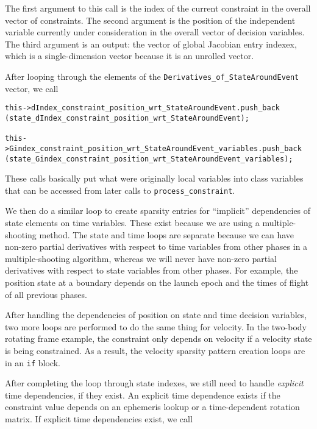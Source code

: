 \documentclass[11pt]{article}
\begin{document}
\noindent The first argument to this call is the index of the current constraint in the overall vector of constraints. The second argument is the position of the independent variable currently under consideration in the overall vector of decision variables. The third argument is an output: the vector of global Jacobian entry indexex, which is a single-dimension vector because it is an unrolled vector.

After looping through the elements of the \texttt{Derivatives\_of\_StateAroundEvent} vector, we call

\begin{verbatim}
this->dIndex_constraint_position_wrt_StateAroundEvent.push_back
(state_dIndex_constraint_position_wrt_StateAroundEvent);

this->Gindex_constraint_position_wrt_StateAroundEvent_variables.push_back
(state_Gindex_constraint_position_wrt_StateAroundEvent_variables);
\end{verbatim}

\noindent These calls basically put what were originally local variables into class variables that can be accessed from later calls to \texttt{process\_constraint}.

We then do a similar loop to create sparsity entries for ``implicit'' dependencies of state elements on time variables. These exist because we are using a multiple-shooting method. The state and time loops are separate because we can have non-zero partial derivatives with respect to time variables from other phases in a multiple-shooting algorithm, whereas we will never have non-zero partial derivatives with respect to state variables from other phases. For example, the position state at a boundary depends on the launch epoch and the times of flight of all previous phases.

After handling the dependencies of position on state and time decision variables, two more loops are performed to do the same thing for velocity. In the two-body rotating frame example, the constraint only depends on velocity if a velocity state is being constrained. As a result, the velocity sparsity pattern creation loops are in an \texttt{if} block.

After completing the loop through state indexes, we still need to handle \emph{explicit} time dependencies, if they exist. An explicit time dependence exists if the constraint value depends on an ephemeris lookup or a time-dependent rotation matrix. If explicit time dependencies exist, we call
\end{document}

